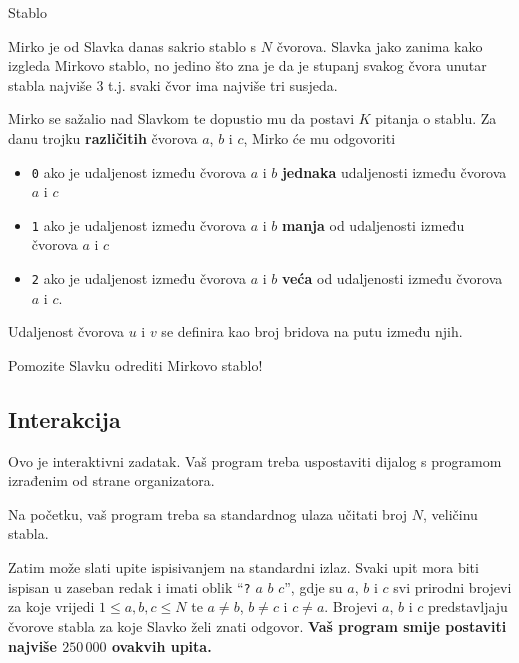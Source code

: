\begin{statement}[
  problempoints=100,
  timelimit=1 sekunda,
  memorylimit=512 MiB,
]{Stablo}\

Mirko je od Slavka danas sakrio stablo s $N$ čvorova. Slavka jako zanima kako izgleda Mirkovo stablo, no jedino što zna je da je stupanj svakog čvora unutar stabla najviše $3$ t.j. svaki čvor ima najviše tri susjeda.

Mirko se sažalio nad Slavkom te dopustio mu da postavi $K$ pitanja o stablu. Za danu trojku \textbf{različitih} čvorova $a$, $b$ i $c$, Mirko će mu odgovoriti
\vspace{-1em}

\begin{itemize}
\item \texttt{0} ako je udaljenost između čvorova $a$ i $b$ \textbf{jednaka} udaljenosti između čvorova $a$ i $c$
\vspace{-0.2em}
\item \texttt{1} ako je udaljenost između čvorova $a$ i $b$ \textbf{manja} od udaljenosti između čvorova $a$ i $c$
\vspace{-0.2em}
\item \texttt{2} ako je udaljenost između čvorova $a$ i $b$ \textbf{veća} od udaljenosti između čvorova $a$ i $c$.
\end{itemize}

\vspace{-0.8em}
Udaljenost čvorova $u$ i $v$ se definira kao broj bridova na putu između njih.
\vspace{-0.2em}

Pomozite Slavku odrediti Mirkovo stablo!

\subsection*{Interakcija}

Ovo je interaktivni zadatak. Vaš program treba uspostaviti dijalog s programom izrađenim od strane organizatora.

Na početku, vaš program treba sa standardnog ulaza učitati broj $N$, veličinu stabla.

Zatim može slati upite ispisivanjem na standardni izlaz. Svaki upit mora biti ispisan u zaseban redak i imati oblik ``\texttt{?} $a$ $b$ $c$'', gdje su $a$, $b$ i $c$ svi prirodni brojevi za koje vrijedi $1 \le a, b, c \le N$ te $a \neq b$, $b \neq c$ i $c \neq a$. Brojevi $a$, $b$ i $c$ predstavljaju čvorove stabla za koje Slavko želi znati odgovor. \textbf{Vaš program smije postaviti najviše $250\,000$ ovakvih upita.}


\end{statement}
